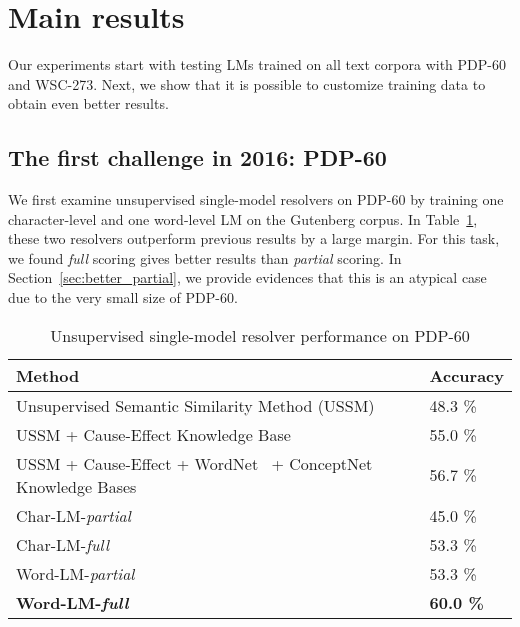 \documentclass{article}
\begin{document}
\section{Main results} \label{sec:exp}


Our experiments start with testing LMs trained on all text corpora with PDP-60 and WSC-273. Next, we show that it is possible to customize training data to obtain even better results.

\subsection{The first challenge in 2016: PDP-60}

We first examine unsupervised single-model resolvers on PDP-60 by training one character-level and one word-level LM on the Gutenberg corpus. In Table~\ref{tab:unsupervised}, these two resolvers outperform previous results by a large margin. For this task, we found \emph{full} scoring gives better results than \emph{partial} scoring. In Section~\ref{sec:better_partial}, we provide evidences that this is an atypical case due to the very small size of PDP-60.

\begin{table}[h!]
  \caption{Unsupervised single-model resolver performance on PDP-60}
  \label{tab:unsupervised}
  \centering\small
  \begin{tabular}{ll}
    \toprule
    Method & Accuracy \\
    \midrule
    Unsupervised Semantic Similarity Method (USSM) &   48.3 \% \\
USSM + Cause-Effect Knowledge Base~\cite{quanliu16causecom} &  55.0 \% \\
    USSM + Cause-Effect + WordNet~\cite{miller1995wordnet} + ConceptNet~\cite{liu2004conceptnet} Knowledge Bases &  56.7 \% \\
    \midrule
    Char-LM-\emph{partial} & 45.0 \% \\
    Char-LM-\emph{full} & 53.3 \% \\
    Word-LM-\emph{partial} & {53.3 \%} \\
    \textbf{Word-LM-\emph{full}} & \textbf{60.0 \%} \\
    \bottomrule
  \end{tabular}
\end{table}
\end{document}
